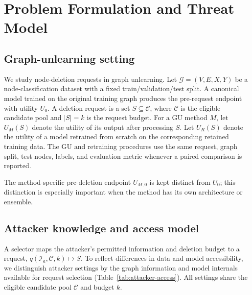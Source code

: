 \section{Problem Formulation and Threat Model}
\label{sec:problem}

\subsection{Graph-unlearning setting}
We study node-deletion requests in graph unlearning. Let $\mathcal{G}=(V,E,X,Y)$ be a node-classification dataset with a fixed train/validation/test split. A canonical model trained on the original training graph produces the pre-request endpoint with utility $U_0$. A deletion request is a set $S\subseteq\mathcal{C}$, where $\mathcal{C}$ is the eligible candidate pool and $|S|=k$ is the request budget. For a GU method $M$, let $U_M(S)$ denote the utility of its output after processing $S$. Let $U_R(S)$ denote the utility of a model retrained from scratch on the corresponding retained training data. The GU and retraining procedures use the same request, graph split, test nodes, labels, and evaluation metric whenever a paired comparison is reported.

The method-specific pre-deletion endpoint $U_{M,0}$ is kept distinct from $U_0$; this distinction is especially important when the method has its own architecture or ensemble.

\subsection{Attacker knowledge and access model}
\label{sec:attacker-access}
A selector maps the attacker's permitted information and deletion budget to a request, $q(\mathcal I_a,\mathcal C,k)\mapsto S$. To reflect differences in data and model accessibility, we distinguish attacker settings by the graph information and model internals available for request selection (Table~\ref{tab:attacker-access}). All settings share the eligible candidate pool $\mathcal C$ and budget $k$.

